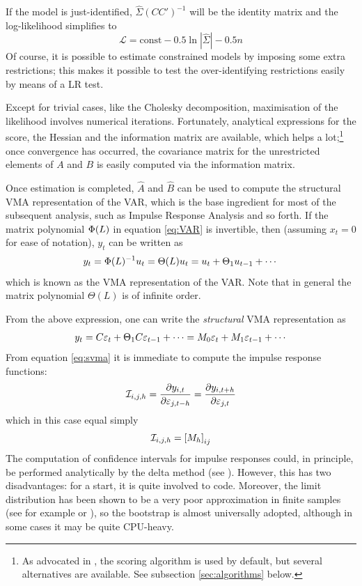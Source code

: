 \documentclass[a4paper,10pt]{article}
\newcommand{\PrE}[1]{\ensuremath u_{#1}} %
\newcommand{\StS}[1]{\ensuremath \varepsilon_{#1}} %
\newcommand{\VarSym}{\ensuremath \Phi}
\newcommand{\IRF}[1]{\ensuremath \mathcal{I}_{#1}}
\newcommand{\pder}[2]{\ensuremath\frac{\partial #1}{\partial #2}}
\begin{document}
If the model is just-identified, $\hat{\Sigma} (CC')^{-1}$ will be the
identity matrix and the log-likelihood simplifies to
\[
  \mathcal{L} = \mathrm{const} - 0.5 \ln |\hat{\Sigma}| - 0.5 n
\]
Of course, it is possible to estimate constrained models by imposing
some extra restrictions; this makes it possible to test the
over-identifying restrictions easily by means of a LR test.

Except for trivial cases, like the Cholesky decomposition,
maximisation of the likelihood involves numerical
iterations. Fortunately, analytical expressions for the score, the
Hessian and the information matrix are available, which helps a
lot;\footnote{As advocated in \citeauthor{AG}, the scoring algorithm
  is used by default, but several alternatives are available. See
  subsection \ref{sec:algorithms} below.} once convergence has
occurred, the covariance matrix for the unrestricted elements of $A$
and $B$ is easily computed via the information matrix.

Once estimation is completed, $\hat{A}$ and $\hat{B}$ can be used to
compute the structural VMA representation of the VAR, which is the
base ingredient for most of the subsequent analysis, such as Impulse
Response Analysis and so forth. If the matrix polynomial $\VarSym(L)$ in
equation \eqref{eq:VAR} is invertible, then (assuming $x_t=0$ for ease of
notation), $y_t$ can be written as
\begin{equation}
  \label{eq:vma}
y_t = \VarSym(L)^{-1}\PrE{t} = \Theta(L) \PrE{t} = \PrE{t} + \Theta_1
\PrE{t-1} + \cdots
\end{equation}
which is known as the VMA representation of the VAR. Note that in
general the matrix polynomial $\Theta(L)$ is of infinite order.

From the above expression, one can write the \emph{structural} VMA
representation as
\begin{equation}
  \label{eq:svma}
  y_t = C \StS{t} + \Theta_1 C \StS{t-1}  + \cdots 
      = M_0 \StS{t} + M_1 \StS{t-1}  + \cdots 
\end{equation}
From equation \eqref{eq:svma} it is immediate to compute the impulse response
functions:
\begin{equation}
  \label{eq:IRFdef}
  \IRF{i,j,h} = \pder{y_{i,t}}{\StS{j, t-h}} = \pder{y_{i,t+h}}{\StS{j, t}} 
\end{equation}
which in this case equal simply
\[
  \IRF{i,j,h} = \left[ M_h \right]_{ij}
\]
The computation of confidence intervals for impulse responses could,
in principle, be performed analytically by the delta method (see
\cite{Lut90}). However, this has two disadvantages: for a start, it is
quite involved to code. Moreover, the limit distribution has been
shown to be a very poor approximation in finite samples (see for
example \cite{FaBra96} or \cite{Kilian98}), so the bootstrap is almost
universally adopted, although in some cases it may be quite CPU-heavy.
\end{document}
